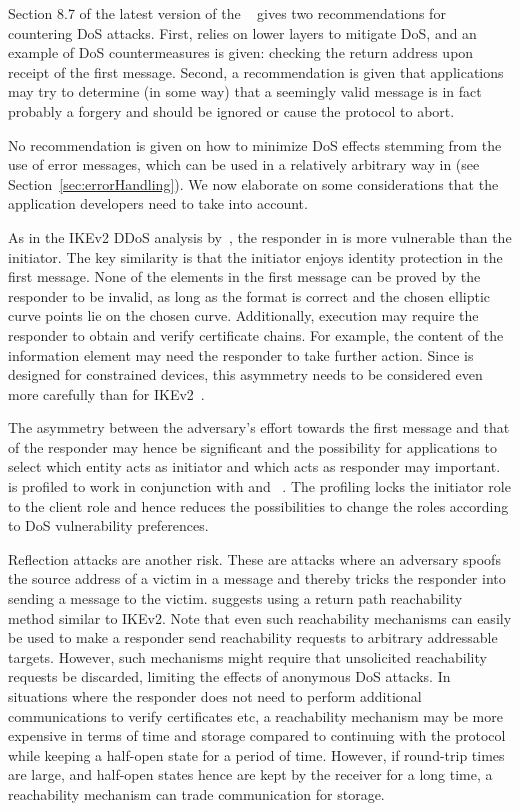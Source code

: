 \documentclass[runningheads]{llncs}
\begin{document}
Section 8.7 of the latest version of the \mEdhoc{}
\mSpec{}~\cite{draft-ietf-lake-edhoc-15}
gives two recommendations for countering DoS attacks.
%
First, \mEdhoc{} relies on lower layers to mitigate DoS, and an example of DoS
countermeasures is given: checking the return address upon receipt of the first
message.
%
Second, a recommendation is given that applications may try to determine (in
some way) that a seemingly valid message is in fact probably a forgery and
should be ignored or cause the protocol to abort.
%

No recommendation is given on how to minimize DoS effects stemming from the use
of error messages, which can be used in a relatively arbitrary way in \mEdhoc{}
(see Section~\ref{sec:errorHandling}).
%
We now elaborate on some considerations that the application developers need to
take into account.
%

As in the IKEv2 DDoS analysis by~\cite{rfc8019}, the responder in \mEdhoc{}
is more vulnerable than the initiator.
%
The key similarity is that the initiator enjoys identity protection in the
first message.
%
None of the elements in the first \mEdhoc{} message can be proved by the
responder to be invalid, as long as the format is correct and the chosen
elliptic curve points lie on the chosen curve.
%
Additionally, execution may require the responder to obtain and verify
certificate chains.
%
For example, the content of the \mADone{} information element may need the
responder to take further action.
%
Since \mEdhoc{} is designed for constrained devices, this asymmetry needs to be
considered even more carefully than for IKEv2~\cite{rfc8019}.
%

The asymmetry between the adversary's effort towards the first message and that
of the responder may hence be significant and the possibility for applications
to select which entity acts as initiator and which acts as responder may
important.
%
\mEdhoc{} is profiled to work in conjunction with \mCoap{} and
\mOscore{}~\cite{ietf-core-oscore-edhoc-03}.
%
The profiling locks the \mEdhoc{} initiator role to the \mCoap{} client role and
hence reduces the possibilities to change the \mEdhoc{} roles according to DoS
vulnerability preferences.
%

Reflection attacks are another risk.
%
These are attacks where an adversary spoofs the source address of a victim in a
message and thereby tricks the responder into sending a message to the victim.
%
\mEdhoc{} suggests using a return path reachability method similar to IKEv2.
%
Note that even such reachability mechanisms can easily be used to make a
responder send reachability requests to arbitrary addressable targets.
%
However, such mechanisms might require that unsolicited reachability 
requests be
discarded, limiting the effects of anonymous DoS attacks.
%
In situations where the responder does not need to perform additional
communications to verify certificates etc, a reachability mechanism may be more
expensive in terms of time and storage compared to continuing with the protocol
while keeping a half-open state for a period of time.
%
However, if round-trip times are large, and half-open states hence are kept by
the receiver for a long time, a reachability mechanism can trade communication
for storage.
%
\end{document}
